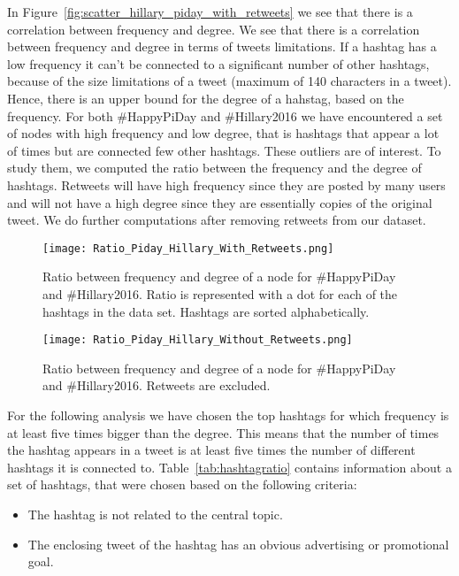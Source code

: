 \documentclass[journal, a4paper, 12pt]{article}
\begin{document}
In Figure~\ref{fig:scatter_hillary_piday_with_retweets} we see that there is a correlation between frequency and degree. We see that there is a correlation between frequency and degree in terms of tweets limitations. If a hashtag has a low frequency it can't be connected to a significant number of other hashtags, because of the size limitations of a tweet (maximum of 140 characters in a tweet). Hence, there is an upper bound for the degree of a hahstag, based on the frequency. For both \#HappyPiDay and \#Hillary2016 we have encountered a set of nodes with high frequency and low degree, that is hashtags that appear a lot of times but are connected few other hashtags. These outliers are of interest. To study them, we computed the ratio between the frequency and the degree of hashtags. %
Retweets will have high frequency since they are posted by many users and will not have a high degree since they are essentially copies of the original tweet. We do further computations after removing retweets from our dataset. \\


    
        \begin{figure}[!hbt]
            \begin{center}
            \texttt{[image: Ratio\_Piday\_Hillary\_With\_Retweets.png]}
            \caption{Ratio between frequency and degree of a node for \#HappyPiDay and \#Hillary2016. Ratio is represented with a dot for each of the hashtags in the data set. Hashtags are sorted alphabetically.}
            \label{fig:ratio_hillary_piday_with_retweets}
            \end{center}
      \end{figure}
    

        \begin{figure}[!hbt]
            \begin{center}
            \texttt{[image: Ratio\_Piday\_Hillary\_Without\_Retweets.png]}
            \caption{Ratio between frequency and degree of a node for \#HappyPiDay and \#Hillary2016. Retweets are excluded.}
            \label{fig:ratio_hillary_piday_without_retweets}
            \end{center}
      \end{figure}
    
    
For the following analysis we have chosen the top hashtags for which frequency is at least five times bigger than the degree. This means that the number of times the hashtag  appears in a tweet is at least five times the number of different hashtags it is connected to. Table~\ref{tab:hashtagratio} contains information about a set of hashtags, that were chosen based on the following criteria:
\begin{itemize}
\item The hashtag is not related to the central topic.
\item The enclosing tweet of the hashtag has an obvious advertising or promotional goal.
\end{itemize}
\end{document}
